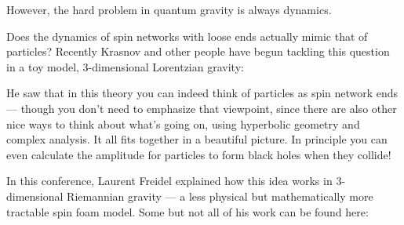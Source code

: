 \documentclass{article}
\renewcommand{\texttt}[1]{%
  \begingroup
  \ttfamily
  \begingroup\lccode`~=`/\lowercase{\endgroup\def~}{/\discretionary{}{}{}}%
  \begingroup\lccode`~=`[\lowercase{\endgroup\def~}{[\discretionary{}{}{}}%
  \begingroup\lccode`~=`.\lowercase{\endgroup\def~}{.\discretionary{}{}{}}%
  \catcode`/=\active\catcode`[=\active\catcode`.=\active
  \scantokens{#1\noexpand}%
  \endgroup
}
\begin{document}
However, the hard problem in quantum gravity is always dynamics.

Does the dynamics of spin networks with loose ends actually mimic that
of particles? Recently Krasnov and other people have begun tackling this
question in a toy model, \(3\)-dimensional Lorentzian gravity:


He saw that in this theory you can indeed think of particles as spin
network ends --- though you don't need to emphasize that viewpoint,
since there are also other nice ways to think about what's going on,
using hyperbolic geometry and complex analysis. It all fits together in
a beautiful picture. In principle you can even calculate the amplitude
for particles to form black holes when they collide!

In this conference, Laurent Freidel explained how this idea works in
3-dimensional Riemannian gravity --- a less physical but mathematically
more tractable spin foam model. Some but not all of his work can be
found here:

\end{document}
